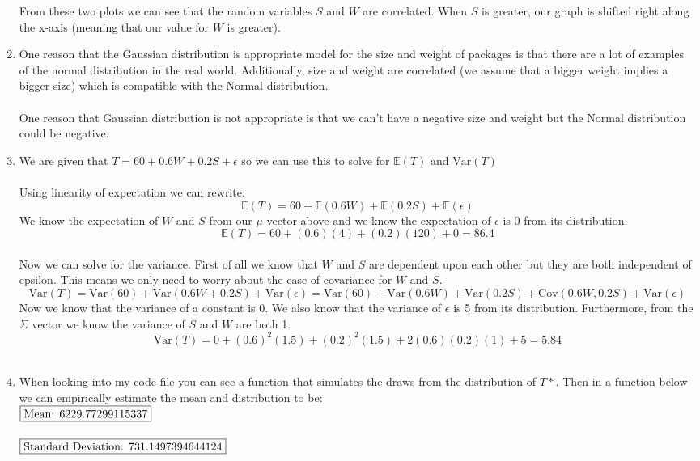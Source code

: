 \documentclass{harvardml}
\theoremstyle{definition}
\theoremstyle{plain}
\begin{document}
\begin{enumerate}
    From these two plots we can see that the random variables $S$ and $W$ are correlated. When $S$ is greater, our graph is shifted right along the x-axis (meaning that our value for $W$ is greater).
    \item
    One reason that the Gaussian distribution is appropriate model for the size and weight of packages is that there are a lot of examples of the normal distribution in the real world. Additionally, size and weight are correlated (we assume that a bigger weight implies a bigger size) which is compatible with the Normal distribution.\\
    \\
    One reason that Gaussian distribution is not appropriate is that we can't have a negative size and weight but the Normal distribution could be negative.\\
    \item
    We are given that $T = 60 + 0.6W + 0.2S + \epsilon$ so we can use this to solve for $\mathbb{E}(T)$ and $\mathrm{Var}(T)$\\
    \\
    Using linearity of expectation we can rewrite:
    $$\mathbb{E}(T) = 60 + \mathbb{E}(0.6W) + \mathbb{E}(0.2S) + \mathbb{E}(\epsilon)$$
    We know the expectation of $W$ and $S$ from our $\mu$ vector above and we know the expectation of $\epsilon$ is 0 from its distribution.
    $$\mathbb{E}(T) = 60 + (0.6)(4) + (0.2)(120) + 0 = \boxed{86.4}$$\\
    Now we can solve for the variance. First of all we know that $W$ and $S$ are dependent upon each other but they are both independent of epsilon. This means we only need to worry about the case of covariance for $W$ and $S$.
    $$\mathrm{Var}(T) = \mathrm{Var}(60) + \mathrm{Var}(0.6W + 0.2S) + \mathrm{Var}(\epsilon) = \mathrm{Var}(60) + \mathrm{Var}(0.6W) + \mathrm{Var}(0.2S) + \mathrm{Cov}(0.6W, 0.2S) + \mathrm{Var}(\epsilon)$$
    Now we know that the variance of a constant is 0. We also know that the variance of $\epsilon$ is 5 from its distribution. Furthermore, from the $\Sigma$ vector we know the variance of $S$ and $W$ are both 1. 
    $$\mathrm{Var}(T) = 0 + (0.6)^2(1.5) + (0.2)^2(1.5) + 2(0.6)(0.2)(1) + 5 = \boxed{5.84}$$\\
    \item
    When looking into my code file you can see a function that simulates the draws from the distribution of $T*$. Then in a function below we can empirically estimate the mean and distribution to be:\\
    $\boxed{\textnormal{Mean: } 6229.77299115337}$\\ 
    \\ $\boxed{\textnormal{Standard Deviation: }731.1497394644124}$
\end{enumerate}
\end{document}
